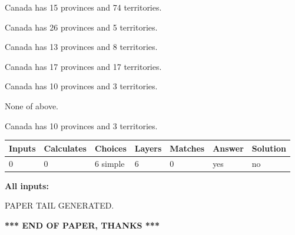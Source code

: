 \documentclass[12pt]{article}
\begin{document}
 
Canada has  15 provinces and  74 territories.
 
 
Canada has  26 provinces and  5 territories.
 
 
Canada has  13 provinces and  8 territories.
 
 
Canada has  17 provinces and  17 territories.
 
 
Canada has 10  provinces and 3 territories.
 
 
 None of above.
 
 
\noindent{}
 
 
Canada has 10  provinces and 3 territories.
 
 
\noindent{}
 
 
   
   
   
   
\noindent\begin{tabular}{|l|l|l|l|l|l|l|}
 \hline
Inputs & Calculates & Choices & Layers & Matches & Answer & Solution \\ \hline
 0  & 
 0  & 
 6
  simple  
  & 
 6  & 
 0  & 
  yes & 
  no 
  \\ \hline
 \end{tabular}
   
   
   
   
\noindent{}
   
   
   
   
\noindent\vspace{0.1in}\hspace{-0.08in} {\textbf{\Large{All inputs: }}}
   
   
   
   
   
   
 \vspace{0.2in}
 
   
   
\vspace{2.0in} PAPER TAIL GENERATED.
   
   
   
   
\vspace{1.0in} 
{\textbf{\large{ *** END OF PAPER, THANKS *** }}} 
   
\end{document}
